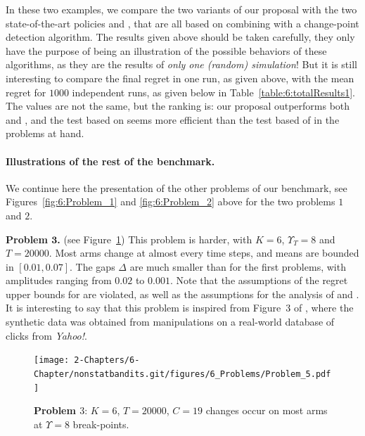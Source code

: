 In these two examples, we compare the two variants of our proposal with the two state-of-the-art policies \CUSUMklUCB{} and \MklUCB,
that are all based on combining \klUCB{} with a change-point detection algorithm.
The results given above should be taken carefully, they only have the purpose of being an illustration of the possible behaviors of these algorithms, as they are the results of \emph{only one (random) simulation}!
But it is still interesting to compare the final regret in one run, as given above, with the mean regret for $1000$ independent runs, as given below in Table~\ref{table:6:totalResults1}.
The values are not the same, but the ranking is: our proposal outperforms both \CUSUMklUCB{} and \MklUCB, and the test based on \CUSUM{} seems more efficient than the test based of \MklUCB{} in the problems at hand.


\paragraph{Illustrations of the rest of the benchmark.}\label{par:6:benchmark2}

We continue here the presentation of the other problems of our benchmark, see Figures~\ref{fig:6:Problem_1} and \ref{fig:6:Problem_2} above for the two problems $1$ and $2$.

\textbf{Problem $\bm 3$.} (see Figure~\ref{fig:6:Problem_5}) This problem is harder, with $K=6$, $\Upsilon_T=8$ and $T=20000$.
Most arms change at almost every time steps,
and means are bounded in $[0.01, 0.07]$.
The gaps $\Delta$ are much smaller than for the first problems, with amplitudes ranging from $0.02$ to $0.001$.
Note that the assumptions of the regret upper bounds for \GLRklUCB{} are violated, as well as the assumptions for the analysis of \MUCB{} and \CUSUMUCB.
It is interesting to say that this problem is inspired from Figure~3 of \cite{CaoZhenKvetonXie18}, where the synthetic data was obtained from manipulations on a real-world database of clicks from \emph{Yahoo!}.

\begin{figure}[h!]  %
    \centering
    \texttt{[image: 2-Chapters/6-Chapter/nonstatbandits.git/figures/6\_Problems/Problem\_5.pdf]}
    \caption{\textbf{Problem $3$}: $K=6$, $T=20000$, $C=19$ changes occur on most arms at $\Upsilon=8$ break-points.}
    \label{fig:6:Problem_5}
\end{figure}


